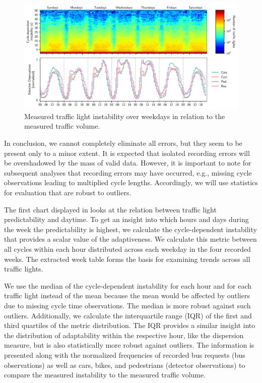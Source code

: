 \begin{figure}[th]
    \centering
    \includegraphics[width=\linewidth]{images/predictability-week-heatmap.pdf}
    \caption{Measured traffic light instability over weekdays in relation to the measured traffic volume.}\label{fig:adaptiveness-weekdays-distance}
\end{figure}

In conclusion, we cannot completely eliminate all errors, but they seem to be present only to a minor extent. It is expected that isolated recording errors will be overshadowed by the mass of valid data. However, it is important to note for subsequent analyses that recording errors may have occurred, e.g., missing cycle observations leading to multiplied cycle lengths. Accordingly, we will use statistics for evaluation that are robust to outliers.


The first chart displayed in  looks at the relation between traffic light predictability and daytime. To get an insight into which hours and days during the week the predictability is highest, we calculate the cycle-dependent instability that provides a scalar value of the adaptiveness. We calculate this metric between all cycles within each hour distributed across each weekday in the four recorded weeks. The extracted week table forms the basis for examining trends across all traffic lights.

We use the median of the cycle-dependent instability for each hour and for each traffic light instead of the mean because the mean would be affected by outliers due to missing cycle time observations. The median is more robust against such outliers. Additionally, we calculate the interquartile range (IQR) of the first and third quartiles of the metric distribution. The IQR provides a similar insight into the distribution of adaptability within the respective hour, like the dispersion measure, but is also statistically more robust against outliers. The information is presented along with the normalized frequencies of recorded bus requests (bus observations) as well as cars, bikes, and pedestrians (detector observations) to compare the measured instability to the measured traffic volume.

